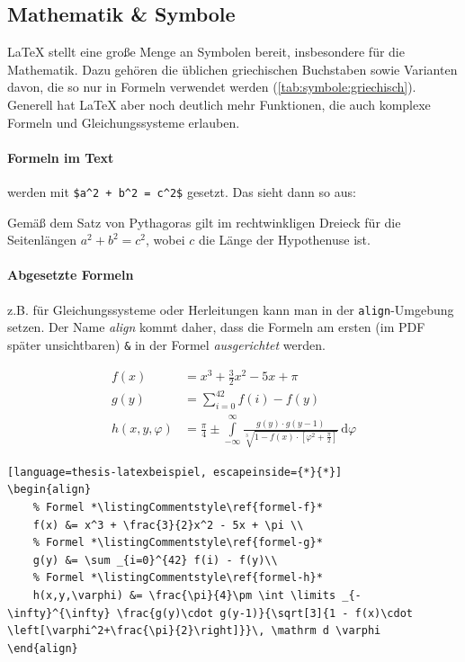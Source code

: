 		\subsection{Mathematik \& Symbole}
			\LaTeX{} stellt eine große Menge an Symbolen bereit, insbesondere für die Mathematik.
			Dazu gehören die üblichen griechischen Buchstaben sowie Varianten davon, die so nur in Formeln verwendet werden (\autoref{tab:symbole:griechisch}). 
			Generell hat \LaTeX{} aber noch deutlich mehr Funktionen, die auch komplexe Formeln und Gleichungssysteme erlauben.
			
			\paragraph{Formeln im Text}
				werden mit \lstinline|$a^2 + b^2 = c^2$| gesetzt.
				Das sieht dann so aus:
				\begin{vorlagenbeispiel}
					Gemäß dem Satz von Pythagoras gilt im rechtwinkligen Dreieck für die Seitenlängen $a^2 + b^2 = c^2$, wobei $c$ die Länge der Hypothenuse ist.
				\end{vorlagenbeispiel}
			
			\paragraph{Abgesetzte Formeln}
				z.B. für Gleichungssysteme oder Herleitungen kann man in der \lstinline|align|-Umgebung setzen. 
				Der Name \emph{align} kommt daher, dass die Formeln am ersten (im PDF später unsichtbaren) \lstinline|&| in der Formel \emph{ausgerichtet} werden.
				\begin{vorlagenbeispiel}
					\begin{align}
						f(x)           &= x^3 + \frac{3}{2}x^2 - 5x + \pi\label{formel-f}\\
						g(y)           &= \sum_{i=0}^{42} f(i) - f(y)\label{formel-g}\\
						h(x,y,\varphi) &= \frac{\pi}{4}\pm \int \limits_{-\infty}^{\infty} \frac{g(y)\cdot g(y-1)}{\sqrt[3]{1 - f(x)\cdot \left[\varphi^2+\frac{\pi}{2}\right]}}\, \mathrm d \varphi\label{formel-h}
					\end{align}
				\end{vorlagenbeispiel}
				\begin{lstlisting}[language=thesis-latexbeispiel, escapeinside={*}{*}]
\begin{align}
	% Formel *\listingCommentstyle\ref{formel-f}*
	f(x) &= x^3 + \frac{3}{2}x^2 - 5x + \pi \\
	% Formel *\listingCommentstyle\ref{formel-g}*
	g(y) &= \sum _{i=0}^{42} f(i) - f(y)\\
	% Formel *\listingCommentstyle\ref{formel-h}*
	h(x,y,\varphi) &= \frac{\pi}{4}\pm \int \limits _{-\infty}^{\infty} \frac{g(y)\cdot g(y-1)}{\sqrt[3]{1 - f(x)\cdot \left[\varphi^2+\frac{\pi}{2}\right]}}\, \mathrm d \varphi
\end{align}
				\end{lstlisting}
